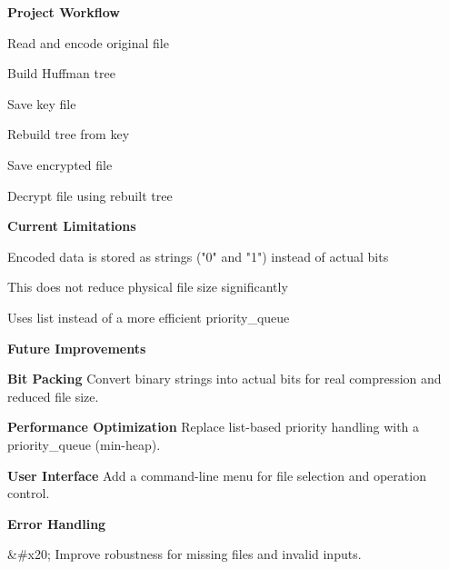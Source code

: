 {\bfseries{Project Workflow}}


\begin{DoxyEnumerate}
\item Read and encode original file
\item Build Huffman tree
\item Save key file
\item Rebuild tree from key
\item Save encrypted file
\item Decrypt file using rebuilt tree
\end{DoxyEnumerate}

{\bfseries{Current Limitations}}


\begin{DoxyItemize}
\item Encoded data is stored as strings ("{}0"{} and "{}1"{}) instead of actual bits
\item This does not reduce physical file size significantly
\item Uses list instead of a more efficient priority\+\_\+queue
\end{DoxyItemize}

{\bfseries{Future Improvements}}


\begin{DoxyEnumerate}
\item {\bfseries{Bit Packing}} Convert binary strings into actual bits for real compression and reduced file size.
\item {\bfseries{Performance Optimization}} Replace list-\/based priority handling with a priority\+\_\+queue (min-\/heap).
\item {\bfseries{User Interface}} Add a command-\/line menu for file selection and operation control.
\item {\bfseries{Error Handling}}
\end{DoxyEnumerate}

\&\+\#x20; Improve robustness for missing files and invalid inputs. 